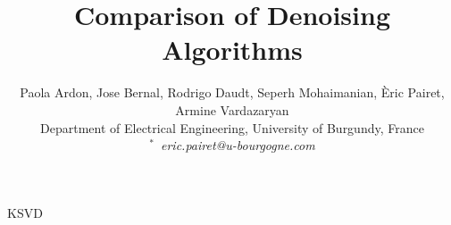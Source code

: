 \documentclass[12pt,journal,compsoc]{IEEEtran}
\begin{document}
\title{Comparison of Denoising Algorithms}
\author{Paola Ardon, Jose Bernal, Rodrigo Daudt, Seperh Mohaimanian, \`Eric Pairet, Armine Vardazaryan
\vspace{0.2cm} \\
        \small{Department of Electrical Engineering, University of Burgundy, France \\
        $^*\,$ \textit{eric.pairet@u-bourgogne.com} \\
        }}
        
 {KSVD}
\setlength\headheight{26pt}


\maketitle




%
%
%

%




\end{document}
